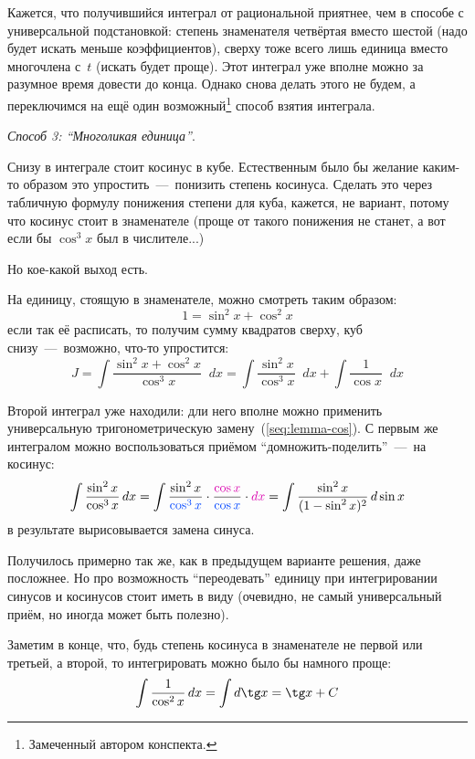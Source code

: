 \documentclass[a4paper,12pt]{article}
\newcommand{\diff}{\mathop{}\!d}
\begin{document}
\begin{solution}
    Кажется, что получившийся интеграл от рациональной приятнее, чем в способе с универсальной подстановкой: степень знаменателя четвёртая вместо шестой (надо будет искать меньше коэффициентов), сверху тоже всего лишь единица вместо многочлена с~$t$ (искать будет проще).
    Этот интеграл уже вполне можно за разумное время довести до конца.
    Однако снова делать этого не будем, а переключимся на ещё один возможный\footnote{
      Замеченный автором конспекта.
    } способ взятия интеграла.

    \medskip

    \noindent
    \emph{Способ 3: ``Многоликая единица''}.

    Снизу в интеграле стоит косинус в кубе.
    Естественным было бы желание каким-то образом это упростить~---~понизить степень косинуса.
    Сделать это через табличную формулу понижения степени для куба, кажется, не вариант, потому что косинус стоит в знаменателе (проще от такого понижения не станет, а вот если бы $\cos^3 x$ был в числителе...)

    Но кое-какой выход есть.

    На единицу, стоящую в знаменателе, можно смотреть таким образом:
    \[
      1 = \sin^2 x + \cos^2 x
    \]
    если так её расписать, то получим сумму квадратов сверху, куб снизу~---~возможно, что-то упростится:
    \[
      J = \int \frac{\sin^2 x + \cos^2 x}{\cos^3 x} \diff x = \int \frac{\sin^2 x}{\cos^3 x} \diff x + \int \frac{1}{\cos x} \diff x
    \]

    Второй интеграл уже находили: дли него вполне можно применить универсальную тригонометрическую замену~(\ref{seq:lemma-cos}).
    С первым же интегралом можно воспользоваться приёмом ``домножить-поделить''~---~на косинус:
    \[
      \int \frac{\sin^2 x}{\cos^3 x} \diff x
        = \int \frac{\sin^2 x}{\textcolor{blue}{\cos^3 x}} \cdot \frac{\textcolor{pink}{\cos x}}{\textcolor{blue}{\cos x}} \cdot \textcolor{pink}{\diff x}
        = \int \frac{\sin^2 x}{(1 - \sin^2 x)^2} \diff \sin x
    \]
    в результате вырисовывается замена синуса.

    Получилось примерно так же, как в предыдущем варианте решения, даже посложнее.
    Но про возможность ``переодевать'' единицу при интегрировании синусов и косинусов стоит иметь в виду (очевидно, не самый универсальный приём, но иногда может быть полезно).

    \medskip

    Заметим в конце, что, будь степень косинуса в знаменателе не первой или третьей, а второй, то интегрировать можно было бы намного проще:
    \[
      \int \frac{1}{\cos^2 x} \diff x = \int \diff \tg x = \tg x + C
    \]
  \end{solution}
\end{document}
